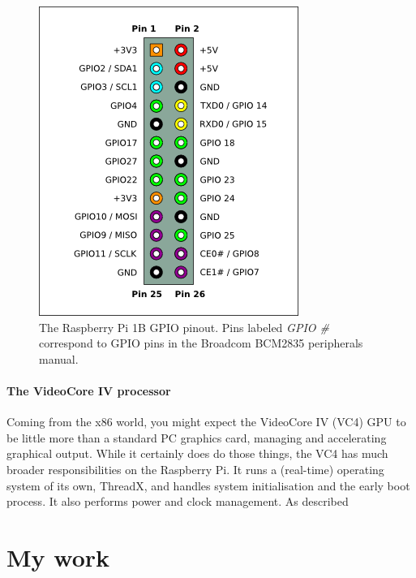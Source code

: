 \documentclass[twoside]{uva-inf-bachelor-thesis}
\begin{document}
\begin{figure}[ht]
    \centering
    \includegraphics[scale=0.65]{latex_template_thesis_v4-2/Pi-GPIO-header-26-sm.png}
    \caption{The Raspberry Pi 1B GPIO pinout. Pins labeled \textit{GPIO \#} correspond to GPIO pins in the Broadcom BCM2835 peripherals manual\cite{bcm:2835peripherals}.}
    \label{fig:gpiopinout}
\end{figure}

\subsubsection{The VideoCore IV processor}
Coming from the x86 world, you might expect the VideoCore IV (VC4) GPU to be little more than a standard PC graphics card, managing and accelerating graphical output. While it certainly does do those things, the VC4 has much broader responsibilities on the Raspberry Pi. It runs a (real-time) operating system of its own, ThreadX\cite{rpi:opensourcevpu}, and handles system initialisation and the early boot process\cite{rpi:bootforum}. It also performs power and clock management\cite{rpi:gpuclockpower}. As described 

\chapter{My work}
\end{document}
